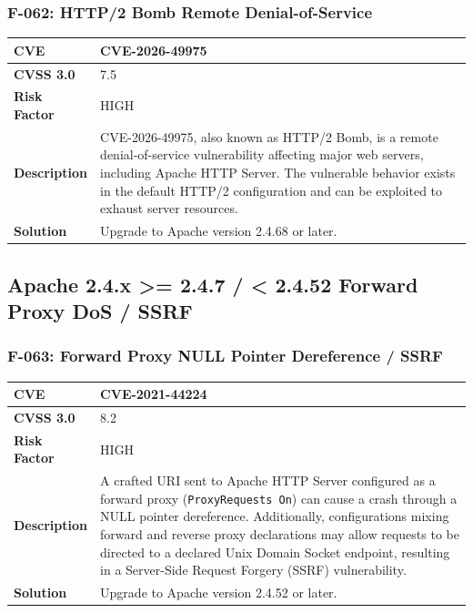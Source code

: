 \subsubsection{F-062: HTTP/2 Bomb Remote Denial-of-Service}
\begin{tabular}{|p{2.8cm}|p{12.2cm}|}
\hline
\textbf{CVE} & CVE-2026-49975 \\ \hline
\textbf{CVSS 3.0} & 7.5 \\ \hline
\textbf{Risk Factor} & HIGH \\ \hline
\textbf{Description} & CVE-2026-49975, also known as HTTP/2 Bomb, is a remote denial-of-service vulnerability affecting major web servers, including Apache HTTP Server. The vulnerable behavior exists in the default HTTP/2 configuration and can be exploited to exhaust server resources. \\ \hline
\textbf{Solution} & Upgrade to Apache version 2.4.68 or later. \\ \hline
\end{tabular}

%
%
\subsection{Apache 2.4.x >= 2.4.7 / < 2.4.52 Forward Proxy DoS / SSRF}

\subsubsection{F-063: Forward Proxy NULL Pointer Dereference / SSRF}
\begin{tabular}{|p{2.8cm}|p{12.2cm}|}
\hline
\textbf{CVE} & CVE-2021-44224 \\ \hline
\textbf{CVSS 3.0} & 8.2 \\ \hline
\textbf{Risk Factor} & HIGH \\ \hline
\textbf{Description} & A crafted URI sent to Apache HTTP Server configured as a forward proxy (\texttt{ProxyRequests On}) can cause a crash through a NULL pointer dereference. Additionally, configurations mixing forward and reverse proxy declarations may allow requests to be directed to a declared Unix Domain Socket endpoint, resulting in a Server-Side Request Forgery (SSRF) vulnerability. \\ \hline
\textbf{Solution} & Upgrade to Apache version 2.4.52 or later. \\ \hline
\end{tabular}

